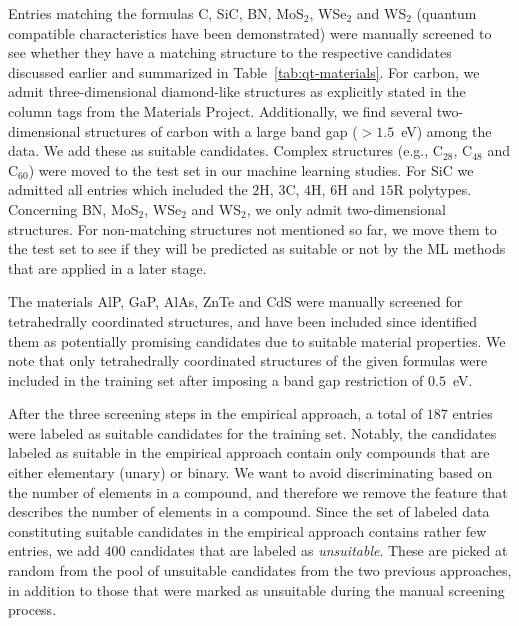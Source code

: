 \documentclass[superscriptaddress,unsortedaddress,
 amsmath,amssymb,
 aps,
]{revtex4-2}
\begin{document}
Entries matching the formulas C, SiC, BN, MoS$_2$, WSe$_2$ and WS$_2$ (quantum compatible characteristics have been demonstrated) were manually screened to see whether they have a matching structure to the respective candidates discussed earlier and summarized in Table~\ref{tab:qt-materials}. 
For carbon, we admit three-dimensional diamond-like structures as explicitly stated in the column tags from the Materials Project. Additionally, we find several two-dimensional structures of carbon with a large band gap ($>1.5$~eV) among the data. We add these as suitable candidates. Complex structures (e.g., C$_{28}$, C$_{48}$ and C$_{60}$) were moved to the test set in our machine learning studies. For SiC we admitted all entries which included the $2$H, $3$C, $4$H, $6$H and $15$R polytypes. Concerning BN, MoS$_2$, WSe$_2$ and WS$_2$, we only admit two-dimensional structures. For non-matching structures not mentioned so far, we move them to the test set to see if they will be predicted as suitable or not by the ML methods that are applied in a later stage.

The materials AlP, GaP, AlAs, ZnTe and CdS were manually screened for tetrahedrally coordinated structures, and have been included since \citeauthor{Weber2010} \cite{Weber2010} identified them as potentially promising candidates due to suitable material properties. 
We note that only tetrahedrally coordinated structures of the given formulas were included in the training set after imposing a band gap restriction of $0.5$~eV. 

After the three screening steps in the empirical approach, a total of $187$ entries were labeled as suitable candidates for the training set. 
Notably, the candidates labeled as suitable in the empirical approach contain only compounds that are either elementary (unary) or binary. 
We want to avoid discriminating based on the number of elements in a compound, and therefore we remove the feature that describes the number of elements in a compound. 
Since the set of labeled data constituting suitable candidates in the empirical approach contains rather few entries, we add $400$ candidates that are labeled as \emph{unsuitable}. These are picked at random from the pool of unsuitable candidates from the two previous approaches, in addition to those that were marked as unsuitable during the manual screening process. 
\end{document}
